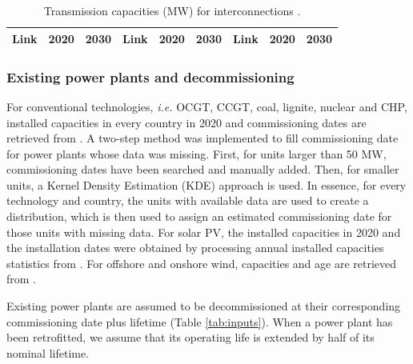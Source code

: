 \documentclass[3p]{elsarticle} %
\begin{document}
\begin{table}
\centering
\caption{Transmission capacities (MW) for interconnections \cite{TYNDP2016}.} \label{tab_interconnections}
\begin{tabular}{|lrr|lrr|lrr|}
\hline
Link & 2020 & 2030 & Link & 2020 & 2030 & Link & 2020 & 2030  \\
\hline

\hline
\end{tabular}
\end{table}

\subsubsection{Existing power plants and decommissioning}

For conventional technologies, \textit{i.e.} OCGT, CCGT, coal, lignite, nuclear and CHP, installed capacities in every country in 2020 and commissioning dates are retrieved from \cite{powerplantmatching}. 
A two-step method was implemented to fill commissioning date for power plants whose data was missing. First, for units larger than 50 MW, commissioning dates have been searched and manually added. Then, for smaller units, a Kernel Density Estimation (KDE) approach is used. In essence, for every technology and country, the units with available data are used to create a distribution, which is then used to assign an estimated commissioning date for those units with missing data. For solar PV, the installed capacities in 2020 and the installation dates were obtained by processing annual installed capacities statistics from \cite{IRENA_2019}. For offshore and onshore wind, capacities and age are retrieved from \cite{thewindpower}.

Existing power plants are assumed to be decommissioned at their corresponding commissioning date plus lifetime (Table \ref{tab:inputs}). When a power plant has been retrofitted, we assume that its operating life is extended by half of its nominal lifetime. 
\end{document}
